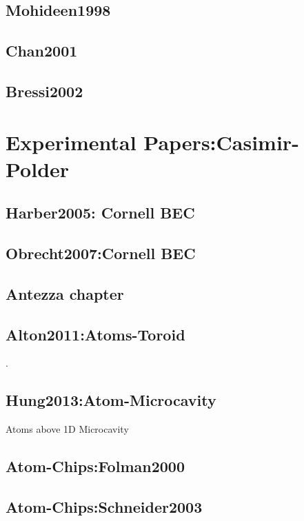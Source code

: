 \cite{Sushkov2011}
\subsection{Mohideen1998}
\cite{Mohideen1998} 

\subsection{Chan2001}

\cite{Chan2001}
\subsection{Bressi2002}

\cite{Bressi2002}

\section{Experimental Papers:Casimir-Polder}
\subsection{Harber2005: Cornell BEC}

\cite{Harber2005}
\subsection{Obrecht2007:Cornell BEC}
\cite{Obrecht2007}

\subsection{Antezza chapter}
\cite{Dalvitbook2011}

\subsection{Alton2011:Atoms-Toroid}

\cite{Alton2011}. 

\subsection{Hung2013:Atom-Microcavity}
 Atoms above 1D Microcavity \cite{Hung2013}


\subsection{Atom-Chips:Folman2000}

\subsection{Atom-Chips:Schneider2003}

